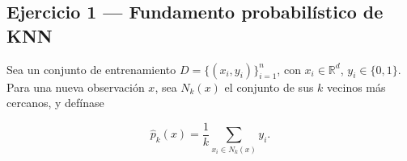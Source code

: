 \subsection{Ejercicio 1 --- Fundamento probabilístico de KNN}

Sea un conjunto de entrenamiento $D=\{(x_i,y_i)\}_{i=1}^n$, con
$x_i\in\mathbb{R}^d$, $y_i\in\{0,1\}$. Para una nueva observación $x$,
sea $N_k(x)$ el conjunto de sus $k$ vecinos más cercanos, y defínase

\[
    \hat p_k(x) = \frac{1}{k}\sum_{x_i \in N_k(x)} y_i .
\]

